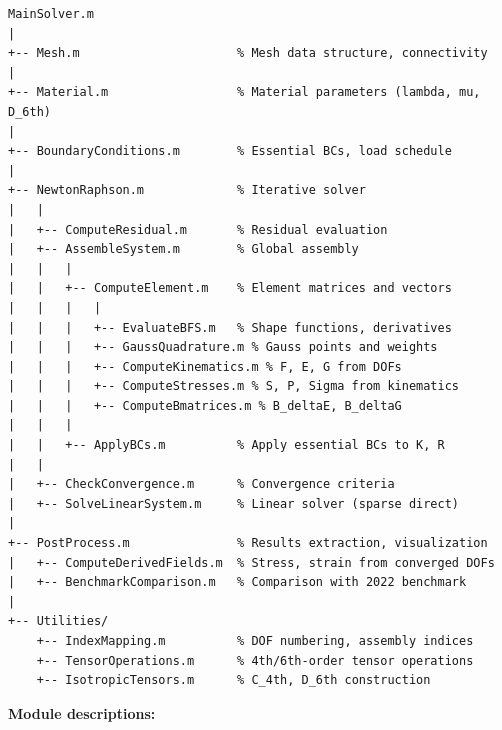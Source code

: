 \documentclass[11pt]{article}
\begin{document}
\begin{verbatim}
MainSolver.m
|
+-- Mesh.m                      % Mesh data structure, connectivity
|
+-- Material.m                  % Material parameters (lambda, mu, D_6th)
|
+-- BoundaryConditions.m        % Essential BCs, load schedule
|
+-- NewtonRaphson.m             % Iterative solver
|   |
|   +-- ComputeResidual.m       % Residual evaluation
|   +-- AssembleSystem.m        % Global assembly
|   |   |
|   |   +-- ComputeElement.m    % Element matrices and vectors
|   |   |   |
|   |   |   +-- EvaluateBFS.m   % Shape functions, derivatives
|   |   |   +-- GaussQuadrature.m % Gauss points and weights
|   |   |   +-- ComputeKinematics.m % F, E, G from DOFs
|   |   |   +-- ComputeStresses.m % S, P, Sigma from kinematics
|   |   |   +-- ComputeBmatrices.m % B_deltaE, B_deltaG
|   |   |
|   |   +-- ApplyBCs.m          % Apply essential BCs to K, R
|   |
|   +-- CheckConvergence.m      % Convergence criteria
|   +-- SolveLinearSystem.m     % Linear solver (sparse direct)
|
+-- PostProcess.m               % Results extraction, visualization
|   +-- ComputeDerivedFields.m  % Stress, strain from converged DOFs
|   +-- BenchmarkComparison.m   % Comparison with 2022 benchmark
|
+-- Utilities/
    +-- IndexMapping.m          % DOF numbering, assembly indices
    +-- TensorOperations.m      % 4th/6th-order tensor operations
    +-- IsotropicTensors.m      % C_4th, D_6th construction
\end{verbatim}

\textbf{Module descriptions:}
\end{document}
